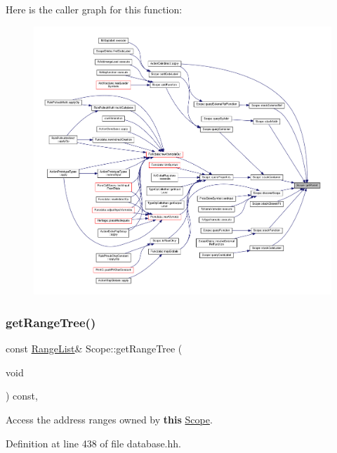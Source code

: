 Here is the caller graph for this function\+:
\nopagebreak
\begin{figure}[H]
\begin{center}
\leavevmode
\includegraphics[width=350pt]{class_scope_ab89674324e529aa340dd8b781a12aa58_icgraph}
\end{center}
\end{figure}
\mbox{\label{class_scope_ae9056f8ed8523a04a5ce8fa4afdd9419}} 
\subsubsection{\texorpdfstring{getRangeTree()}{getRangeTree()}}
{\footnotesize\ttfamily const \mbox{\hyperlink{class_range_list}{Range\+List}}\& Scope\+::get\+Range\+Tree (\begin{DoxyParamCaption}\item[{void}]{ }\end{DoxyParamCaption}) const\hspace{0.3cm}{\ttfamily [inline]}, {\ttfamily [protected]}}



Access the address ranges owned by {\bfseries{this}} \mbox{\hyperlink{class_scope}{Scope}}. 



Definition at line 438 of file database.\+hh.


